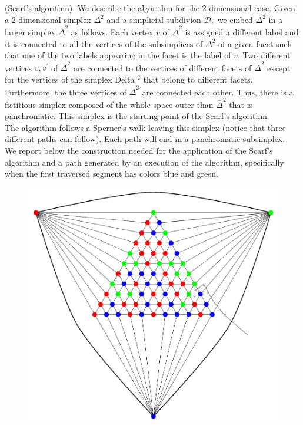 (Scarf's algorithm). We describe the algorithm for the 2-dimensional case. Given a 2-dimensional simplex $\Delta^{2}$ and a simplicial subdivion $\mathcal{D},$ we embed $\Delta^{2}$ in a larger simplex $\bar{\Delta}^{2}$ as follows. Each vertex $v$ of $\bar{\Delta}^{2}$ is assigned a different label and it is connected to all the vertices of the subsimplices of $\Delta^{2}$ of a given facet such that one of the two labels appearing in the facet is the label of $v$. Two different vertices $v, v^{\prime}$ of $\bar{\Delta}^{2}$ are connected to the vertices of different facets of $\bar{\Delta}^{2}$ except for the vertices of the simplex Delta $^{2}$ that belong to different facets. Furthermore, the three vertices of $\bar{\Delta}^{2}$ are connected each other. Thus, there is a fictitious simplex composed of the whole space outer than $\bar{\Delta}^{2}$ that is panchromatic. This simplex is the starting point of the Scarf's algorithm.\\
The algorithm follows a Sperner's walk leaving this simplex (notice that three different paths can follow). Each path will end in a panchromatic subsimplex.\\
We report below the construction needed for the application of the Scarf’s algorithm and a path generated by an execution of the algorithm, specifically when the first traversed segment has colors blue and green.
\begin{figure}[H]
\centering
\includegraphics[width=\textwidth]{images/img_2_10_02.png}
\end{figure}
